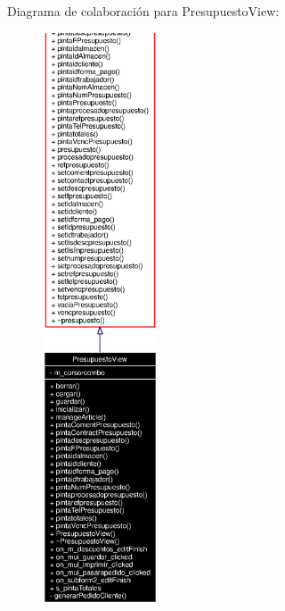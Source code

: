 Diagrama de colaboraci\'{o}n para Presupuesto\-View:\begin{figure}[H]
\begin{center}
\leavevmode
\includegraphics[width=97pt]{classPresupuestoView__coll__graph}
\end{center}
\end{figure}
